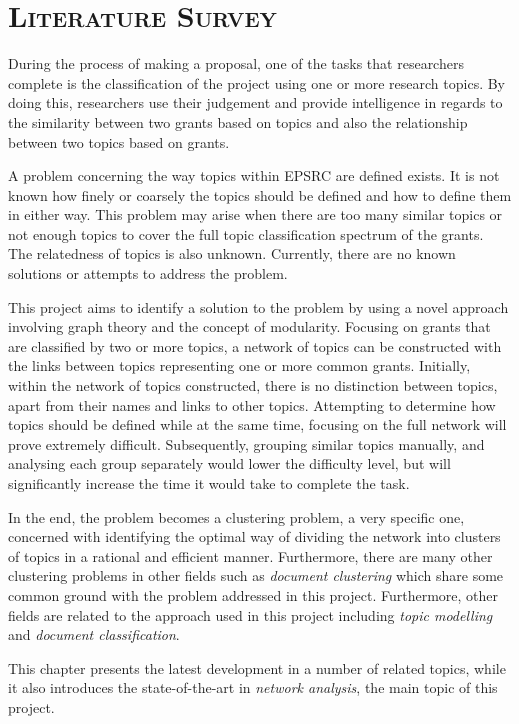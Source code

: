 \chapter{\textsc{Literature Survey}}
\label{chapter:literature_survey}

During the process of making a proposal, one of the tasks that researchers complete is the classification of the project using one or more research topics. By doing this, researchers use their judgement and provide intelligence in regards to the similarity between two grants based on topics and also the relationship between two topics based on grants. 

A problem concerning the way topics within EPSRC are defined exists. It is not known how finely or coarsely the topics should be defined and how to define them in either way. This problem may arise when there are too many similar topics or not enough topics to cover the full topic classification spectrum of the grants. The relatedness of topics is also unknown. Currently, there are no known solutions or attempts to address the problem.

This project aims to identify a solution to the problem by using a novel approach involving graph theory and the concept of modularity. Focusing on grants that are classified by two or more topics, a network of topics can be constructed with the links between topics representing one or more common grants. Initially, within the network of topics constructed, there is no distinction between topics, apart from their names and links to other topics. Attempting to determine how topics should be defined while at the same time, focusing on the full network will prove extremely difficult. Subsequently, grouping similar topics manually, and analysing each group separately would lower the difficulty level, but will significantly increase the time it would take to complete the task.

In the end, the problem becomes a clustering problem, a very specific one, concerned with identifying the optimal way of dividing the network into clusters of topics in a rational and efficient manner. Furthermore, there are many other clustering problems in other fields such as \textit{document clustering} which share some common ground with the problem addressed in this project. Furthermore, other fields are related to the approach used in this project including \textit{topic modelling} and \textit{document classification}.

This chapter presents the latest development in a number of related topics, while it also introduces the state-of-the-art in \textit{network analysis}, the main topic of this project.

